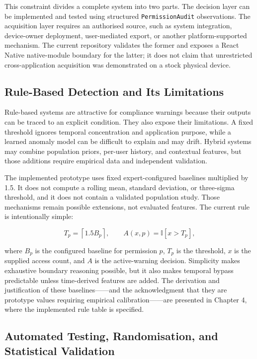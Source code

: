 This constraint divides a complete system into two parts. The decision layer can be implemented and tested using structured \texttt{PermissionAudit} observations. The acquisition layer requires an authorised source, such as system integration, device-owner deployment, user-mediated export, or another platform-supported mechanism. The current repository validates the former and exposes a React Native native-module boundary for the latter; it does not claim that unrestricted cross-application acquisition was demonstrated on a stock physical device.

\subsection{Rule-Based Detection and Its Limitations}

Rule-based systems are attractive for compliance warnings because their outputs can be traced to an explicit condition. They also expose their limitations. A fixed threshold ignores temporal concentration and application purpose, while a learned anomaly model can be difficult to explain and may drift. Hybrid systems may combine population priors, per-user history, and contextual features, but those additions require empirical data and independent validation.

The implemented prototype uses fixed expert-configured baselines multiplied by 1.5. It does not compute a rolling mean, standard deviation, or three-sigma threshold, and it does not contain a validated population study. Those mechanisms remain possible extensions, not evaluated features. The current rule is intentionally simple:

\begin{equation}
T_p=\left\lceil 1.5B_p \right\rceil,\qquad
A(x,p)=\mathbb{I}[x>T_p],
\end{equation}

where $B_p$ is the configured baseline for permission $p$, $T_p$ is the threshold, $x$ is the supplied access count, and $A$ is the active-warning decision. Simplicity makes exhaustive boundary reasoning possible, but it also makes temporal bypass predictable unless time-derived features are added. The derivation and justification of these baselines——and the acknowledgment that they are prototype values requiring empirical calibration——are presented in Chapter 4, where the implemented rule table is specified.

\subsection{Automated Testing, Randomisation, and Statistical Validation}

